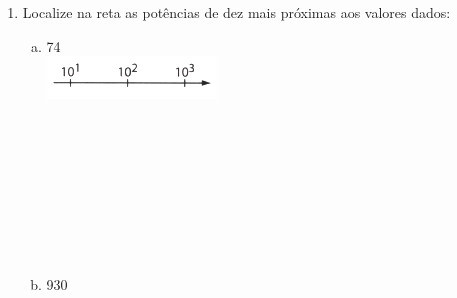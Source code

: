 \documentclass[a4paper,14pt]{article}
\begin{document}
\begin{multicols}{2}
\begin{enumerate}
\begin{enumerate}[a)]
				\item 12 \\
				\item 34 \\\\\\
				\item 94 \\\\\\
				\item 146 \\\\\\
				\item 439 \\\\\\
				\item 791 \\\\\\
				\item 1 456 \\\\\\
				\item 3 970 \\\\\\
				\item 2 504 \newpage
			\end{enumerate}
			\item Localize na reta as potências de dez mais próximas aos valores dados:
			\begin{enumerate}[a)]
				\item 74 \\
				\includegraphics[width=1\linewidth]{6FMA148_imagens/imagem1} \\\\\\\\\\\\\\\\\\
				\item 930 \\

\end{enumerate}
\end{enumerate}
\end{multicols}
\end{document}
